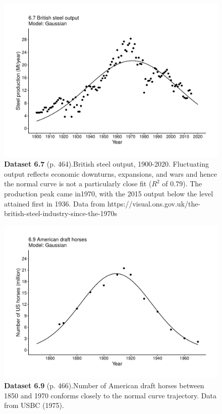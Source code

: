\documentclass[aps,rmp,preprint,superscriptaddress,10pt,onecolumn]{article}
\begin{document}
\clearpage
\begin{figure}[h]
\includegraphics[width=\textwidth]{output/figs-ggplot/6.7.pdf}
\caption*{\textbf{Dataset 6.7} (p. 464).British steel output, 1900-2020. Fluctuating output reflects economic downturns, expansions, and wars and hence the normal curve is not a particularly close fit ($R^2$ of 0.79). The production peak came in1970, with the 2015 output below the level attained first in 1936. Data from https://visual.ons.gov.uk/the-british-steel-industry-since-the-1970s}
\end{figure}
	
\clearpage
\begin{figure}[h]
\includegraphics[width=\textwidth]{output/figs-ggplot/6.9.pdf}
\caption*{\textbf{Dataset 6.9} (p. 466).Number of American draft horses between 1850 and 1970 conforms closely to the normal curve trajectory. Data from USBC (1975). }
\end{figure}
	
\end{document}
